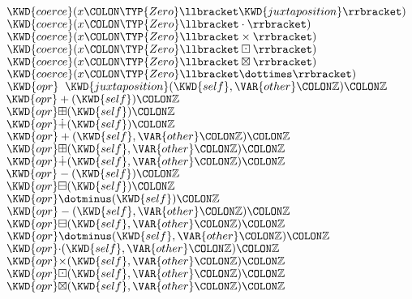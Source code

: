 \begin{Fortress}
\(  \KWD{coerce}(x\COLON \TYP{Zero}\llbracket\KWD{juxtaposition}\rrbracket)\)\\
\(  \KWD{coerce}(x\COLON \TYP{Zero}\llbracket\cdot\rrbracket)\)\\
\(  \KWD{coerce}(x\COLON \TYP{Zero}\llbracket\times\rrbracket)\)\\
\(  \KWD{coerce}(x\COLON \TYP{Zero}\llbracket\boxdot\rrbracket)\)\\
\(  \KWD{coerce}(x\COLON \TYP{Zero}\llbracket\boxtimes\rrbracket)\)\\
\(  \KWD{coerce}(x\COLON \TYP{Zero}\llbracket\dottimes\rrbracket)\)\\
\(  \KWD{opr}\;\;\KWD{juxtaposition}(\KWD{self}, \VAR{other}\COLON \mathbb{Z})\COLON \mathbb{Z}\)\\
\(  \KWD{opr} +(\KWD{self})\COLON \mathbb{Z}\)\\
\(  \KWD{opr} \mathord{\boxplus}(\KWD{self})\COLON \mathbb{Z}\)\\
\(  \KWD{opr} \mathord{\dotplus}(\KWD{self})\COLON \mathbb{Z}\)\\
\(  \KWD{opr} +(\KWD{self}, \VAR{other}\COLON \mathbb{Z})\COLON \mathbb{Z}\)\\
\(  \KWD{opr} \mathord{\boxplus}(\KWD{self}, \VAR{other}\COLON \mathbb{Z})\COLON \mathbb{Z}\)\\
\(  \KWD{opr} \mathord{\dotplus}(\KWD{self}, \VAR{other}\COLON \mathbb{Z})\COLON \mathbb{Z}\)\\
\(  \KWD{opr} -(\KWD{self})\COLON \mathbb{Z}\)\\
\(  \KWD{opr} \mathord{\boxminus}(\KWD{self})\COLON \mathbb{Z}\)\\
\(  \KWD{opr} \mathord{\dotminus}(\KWD{self})\COLON \mathbb{Z}\)\\
\(  \KWD{opr} -(\KWD{self}, \VAR{other}\COLON \mathbb{Z})\COLON \mathbb{Z}\)\\
\(  \KWD{opr} \mathord{\boxminus}(\KWD{self}, \VAR{other}\COLON \mathbb{Z})\COLON \mathbb{Z}\)\\
\(  \KWD{opr} \mathord{\dotminus}(\KWD{self}, \VAR{other}\COLON \mathbb{Z})\COLON \mathbb{Z}\)\\
\(  \KWD{opr} \mathord{\cdot}(\KWD{self}, \VAR{other}\COLON \mathbb{Z})\COLON \mathbb{Z}\)\\
\(  \KWD{opr} \mathord{\times}(\KWD{self}, \VAR{other}\COLON \mathbb{Z})\COLON \mathbb{Z}\)\\
\(  \KWD{opr} \mathord{\boxdot}(\KWD{self}, \VAR{other}\COLON \mathbb{Z})\COLON \mathbb{Z}\)\\
\(  \KWD{opr} \mathord{\boxtimes}(\KWD{self}, \VAR{other}\COLON \mathbb{Z})\COLON \mathbb{Z}\)\\

\end{Fortress}
